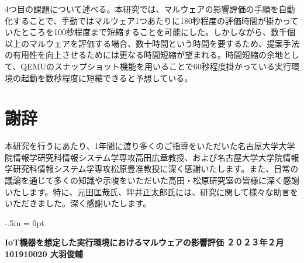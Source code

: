 \documentclass[12pt,a4paper,titlepage,report]{jsbook}
\begin{document}
4つ目の課題について述べる。本研究では、マルウェアの影響評価の手順を自動化することで、手動ではマルウェア1つあたりに180秒程度の評価時間が掛かっていたところを100秒程度まで短縮することを可能にした。しかしながら、数千個以上のマルウェアを評価する場合、数十時間という時間を要するため、提案手法の有用性を向上させるためには更なる時間短縮が望まれる。時間短縮の余地として、QEMUのスナップショット機能を用いることで60秒程度掛かっている実行環境の起動を数秒程度に短縮できると予想している。






\newpage
\renewcommand{\bibname}{参考文献}


\chapter*{謝辞}
本研究を行うにあたり、1年間に渡り多くのご指導をいただいた名古屋大学大学院情報学研究科情報システム学専攻高田広章教授、および名古屋大学大学院情報学研究科情報システム学専攻松原豊准教授に深く感謝いたします。また、日常の議論を通じて多くの知識や示唆をいただいた高田・松原研究室の皆様に深く感謝いたします。特に、元田匡哉氏、坪井正太郎氏には、研究に関して様々な助言をいただきました。深く感謝いたします。


\clearpage
\thispagestyle{empty}
\oddsidemargin -2.5in
\evensidemargin -2.5in
\topmargin -.5in
\marginparwidth = 0pt
{
	\tate
	\begin{minipage}{8.0in}
		\small
		\textbf{IoT機器を想定した実行環境におけるマルウェアの影響評価}
		\hfill
		\textbf{２０２３年２月}
		\hfill
		\textbf{101910020 大羽俊輔}
	\end{minipage}
}
\end{document}
